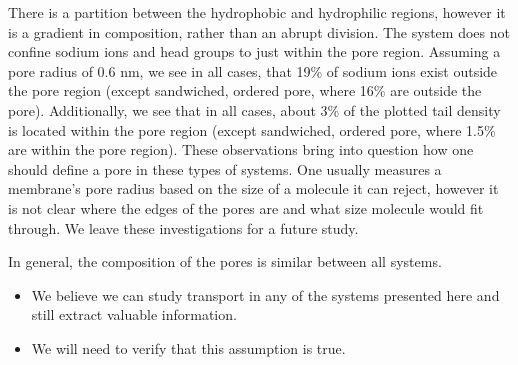 \documentclass{article}
\begin{document}
  There is a partition between the hydrophobic and hydrophilic regions, however
  it is a gradient in composition, rather than an abrupt division. The system
  does not confine sodium ions and head groups to just within the pore region.
  Assuming a pore radius of 0.6 nm, we see in all cases, that 19\% of sodium ions
  exist outside the pore region (except sandwiched, ordered pore, where 16\%
  are outside the pore). Additionally, we see that in all cases, about 3\% of the
  plotted tail density is located within the pore region (except sandwiched,
  ordered pore, where 1.5\% are within the pore region). These observations bring
  into question how one should define a pore in these types of systems. One
  usually measures a membrane's pore radius based on the size of a molecule it
  can reject, however it is not clear where the edges of the pores are and what
  size molecule would fit through. We leave these investigations for a future
  study.
  
  In general, the composition of the pores is similar between all systems. 
  \begin{itemize}
  	\item We believe we can study transport in any of the systems presented here and
  	still extract valuable information.
  	\item We will need to verify that this assumption is true.
  \end{itemize}  
\end{document}
